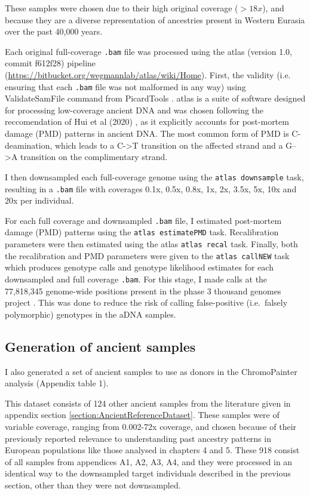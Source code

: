 These samples were chosen due to their high original coverage ($>18x$), and because they are a diverse representation of ancestries present in Western Eurasia over the past 40,000 years.  

Each original full-coverage \texttt{.bam} file was processed using the atlas (version 1.0, commit f612f28) pipeline \cite{Link2017} \\(\url{https://bitbucket.org/wegmannlab/atlas/wiki/Home}). First, the validity (i.e. ensuring that each \texttt{.bam} file was not malformed in any way) using ValidateSamFile command from PicardTools \cite{Picard2018toolkit}. atlas is a suite of software designed for processing low-coverage ancient DNA and was chosen following the reccomendation of Hui et al (2020) \cite{hui2020evaluating}, as it explicitly accounts for post-mortem damage (PMD) patterns in ancient DNA. The most common form of PMD is C-deamination, which leads to a C->T transition on the affected strand and a G-->A transition on the complimentary strand.

I then downsampled each full-coverage genome using the \texttt{atlas downsample} task, resulting in a \texttt{.bam} file with coverages 0.1x, 0.5x, 0.8x, 1x, 2x, 3.5x, 5x, 10x and 20x per individual. 

For each full coverage and downsampled \texttt{.bam} file, I estimated post-mortem damage (PMD) patterns using the \texttt{atlas estimatePMD} task. Recalibration parameters were then estimated using the atlas \texttt{atlas recal} task. Finally, both the recalibration and PMD parameters were given to the \texttt{atlas callNEW} task which produces genotype calls and genotype likelihood estimates for each downsampled and full coverage \texttt{.bam}. For this stage, I made calls at the 77,818,345 genome-wide positions present in the phase 3 thousand genomes project \cite{1000GenomesProjectConsortium2015}. This was done to reduce the risk of calling false-positive (i.e.\ falsely polymorphic) genotypes in the aDNA samples.

\subsection{Generation of ancient samples} \label{AncientReferenceSamples}

I also generated a set of ancient samples to use as donors in the ChromoPainter analysis (Appendix table 1).

This dataset consists of 124 other ancient samples from the literature given in appendix section \ref{section:AncientReferenceDataset}. These samples were of variable coverage, ranging from 0.002-72x coverage, and chosen because of their previously reported relevance to understanding past ancestry patterns in European populations like those analysed in chapters 4 and 5. These 918 consist of all samples from appendices A1, A2, A3, A4, and they were processed in an identical way to the downsampled target individuals described in the previous section, other than they were not downsampled.  


